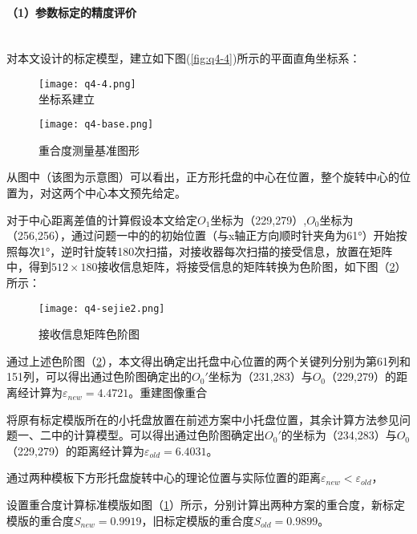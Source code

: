 \documentclass[withoutpreface,bwprint]{cumcmthesis} %
\begin{document}
\newpage
\paragraph*{（1）参数标定的精度评价}~\\
对本文设计的标定模型，建立如下图(\ref{fig:q4-4})所示的平面直角坐标系：

\begin{figure}[!htbp]  
\begin{minipage}[t]{0.5\textwidth}
\centering  
\texttt{[image: q4-4.png]} \\
\caption{坐标系建立} \label{fig:q4-4}
\end{minipage}
\hspace{1ex}
\begin{minipage}[t]{0.5\textwidth}  
\centering  
\texttt{[image: q4-base.png]}\\
\caption{重合度测量基准图形} \label{fig:q4-base}
\end{minipage}  
\end{figure} 


从图中（该图为示意图）可以看出，正方形托盘的中心在位置，整个旋转中心的位置为，对这两个中心本文预先给定。

对于中心距离差值的计算假设本文给定$O_1$坐标为（229,279）,$O_0$坐标为（256,256），通过问题一中的的初始位置（与x轴正方向顺时针夹角为61°）开始按照每次1°，逆时针旋转180次扫描，对接收器每次扫描的接受信息，放置在矩阵中，得到$512\times 180$接收信息矩阵，将接受信息的矩阵转换为色阶图，如下图（\ref{fig:q4-sejie2}）所示：

\begin{figure}[h]
\small
\centering
\texttt{[image: q4-sejie2.png]}
\caption{接收信息矩阵色阶图} \label{fig:q4-sejie2}
\end{figure}

通过上述色阶图（\ref{fig:q4-sejie2}），本文得出确定出托盘中心位置的两个关键列分别为第61列和151列，可以得出通过色阶图确定出的$O_0'$坐标为（231,283）与$O_0$（229,279）的距离经计算为$\varepsilon_{new} = 4.4721$。重建图像重合

将原有标定模版所在的小托盘放置在前述方案中小托盘位置，其余计算方法参见问题一、二中的计算模型。可以得出通过色阶图确定出$O_0'$的坐标为（234,283）与$O_0$（229,279）的距离经计算为$\varepsilon_{old} = 6.4031$。

通过两种模板下方形托盘旋转中心的理论位置与实际位置的距离$\varepsilon_{new}<\varepsilon_{old}$，

设置重合度计算标准模版如图（\ref{fig:q4-base}）所示，分别计算出两种方案的重合度，新标定模版的重合度$S_{new} = 0.9919$，旧标定模版的重合度$S_{old} = 0.9899$。
\end{document}
